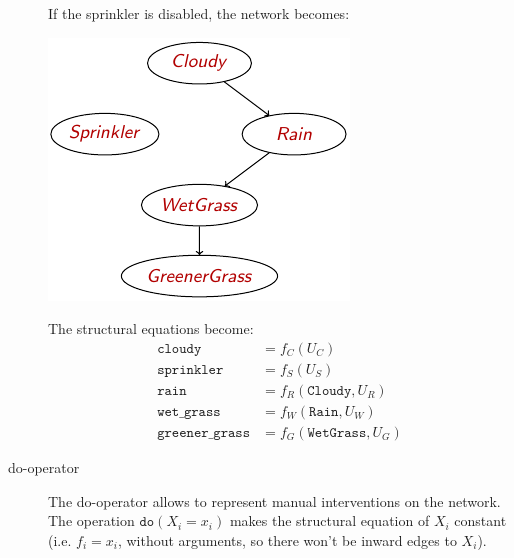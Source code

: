 \begin{description}
\begin{example}
            If the sprinkler is disabled, the network becomes:\\[0.5em]
            \begin{minipage}{.3\linewidth}
                \centering
                \includegraphics[width=\linewidth]{img/_causal_network_example2.pdf}
            \end{minipage}
            \begin{minipage}{.6\linewidth}
                The structural equations become:
                \[ 
                    \begin{split}
                        \texttt{cloudy} &= f_C(U_C) \\
                        \texttt{sprinkler} &= f_S(U_S) \\
                        \texttt{rain} &= f_R(\texttt{Cloudy}, U_R) \\
                        \texttt{wet\_grass} &= f_W(\texttt{Rain}, U_W) \\
                        \texttt{greener\_grass} &= f_G(\texttt{WetGrass}, U_G)
                    \end{split}
                \]
            \end{minipage}
        \end{example}

    \item[do-operator] 
        The do-operator allows to represent manual interventions on the network.
        The operation $\texttt{do}(X_i = x_i)$ makes the structural equation of $X_i$
        constant (i.e. $f_i = x_i$, without arguments, so there won't be inward edges to $X_i$).


\end{description}
